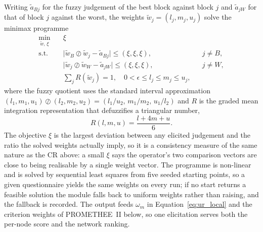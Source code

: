 Writing $\tilde{a}_{Bj}$ for the fuzzy judgement of the best block against block $j$ and
$\tilde{a}_{jW}$ for that of block $j$ against the worst, the weights
$\tilde{w}_j = (l_j, m_j, u_j)$ solve the minimax programme
\begin{equation}
\begin{aligned}
    \min_{\tilde{w},\,\xi} \quad & \xi \\
    \text{s.t.} \quad
    & \bigl|\tilde{w}_B \oslash \tilde{w}_j - \tilde{a}_{Bj}\bigr| \le (\xi,\xi,\xi),
      && j \ne B, \\
    & \bigl|\tilde{w}_j \oslash \tilde{w}_W - \tilde{a}_{jW}\bigr| \le (\xi,\xi,\xi),
      && j \ne W, \\
    & \textstyle\sum_j R(\tilde{w}_j) = 1,
      \quad 0 < \epsilon \le l_j \le m_j \le u_j ,
\end{aligned}
\label{eq:fbwm}
\end{equation}
where the fuzzy quotient uses the standard interval approximation
$(l_1,m_1,u_1) \oslash (l_2,m_2,u_2) = (l_1/u_2,\, m_1/m_2,\, u_1/l_2)$ and $R$ is the
graded mean integration representation that defuzzifies a triangular number,
\begin{equation}
    R(l, m, u) = \frac{l + 4m + u}{6}.
    \label{eq:gmir}
\end{equation}
The objective $\xi$ is the largest deviation between any elicited judgement and the ratio the
solved weights actually imply, so it is a consistency measure of the same nature as the
$\mathrm{CR}$ above: a small $\xi$ says the operator's two comparison vectors are close to
being realisable by a single weight vector. The programme is non-linear and is solved by
sequential least squares from five seeded starting points, so a given questionnaire yields
the same weights on every run; if no start returns a feasible solution the module falls back
to uniform weights rather than raising, and the fallback is recorded. The output feeds
$\omega_m$ in Equation~\ref{eq:ur_local} and the criterion weights of PROMETHEE~II below, so
one elicitation serves both the per-node score and the network ranking.

